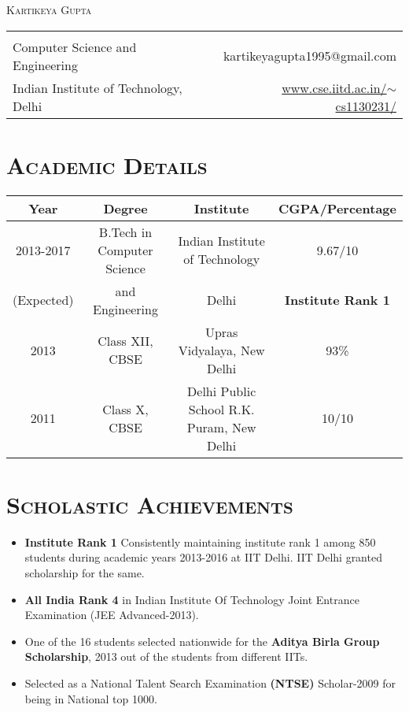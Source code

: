 \documentclass{article}
\newcommand{\tmpsection}[1]{}
\let\tmpsection=\section
\renewcommand{\section}[1]{\tmpsection*{\textsc{#1}}}
\begin{document}
\begin{center}
 {\large \textsc{Kartikeya Gupta} }\\ 
\begin{tabular}{ l p{4cm} r }
    & &   \\
  Computer Science and Engineering & & kartikeyagupta1995@gmail.com \\
  Indian Institute of Technology, Delhi & & \href{http://www.cse.iitd.ac.in/~cs1130231/}{www.cse.iitd.ac.in/$\sim$cs1130231/} \\
\end{tabular}
\end{center}


\section{Academic Details}
\begin{center}
\begin{tabular}{ |c | c | c | c |}
\hline
Year & Degree & Institute & CGPA/Percentage \\ 
\hline
2013-2017 & B.Tech in Computer Science & Indian Institute of Technology & 9.67/10 \\ 
(Expected) & and Engineering & Delhi & \textbf{Institute Rank 1} \\ 
\hline
2013 & Class XII, CBSE & Upras Vidyalaya, New Delhi & 93\% \\ 
\hline
2011 & Class X, CBSE & Delhi Public School R.K. Puram,  New Delhi & 10/10 \\  \hline
\end{tabular}
\end{center}

\section{Scholastic Achievements}
\begin{itemize}
    \setlength\itemsep{0em}
    \item \textbf{Institute Rank 1}  Consistently maintaining institute rank 1 among 850 students during academic years 2013-2016 at IIT Delhi. IIT Delhi granted scholarship for the same.  
    \item \textbf{All India Rank 4} in Indian Institute Of Technology Joint Entrance Examination (JEE Advanced-2013).

    \item One of the 16 students selected nationwide for the \textbf{Aditya Birla Group Scholarship}, 2013 out of the students from different IITs.
    \item Selected as a National Talent Search Examination\textbf{ (NTSE)}  Scholar-2009 for being in National top 1000.
\end{itemize}
\end{document}
